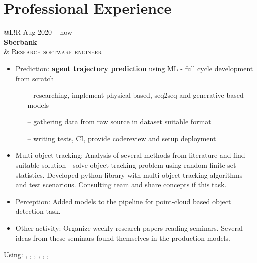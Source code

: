 \section*{Professional Experience}
\vspace{-0.5em}
\begin{tabular}{@{}L!{\VRule}R}
    Aug 2020 -- now                                                                                                                      \\ {\bf Sberbank} \\  &
    {\textsc{Research software engineer}}
    \begin{itemize}
        \item Prediction: \textbf{agent trajectory prediction} using ML - full cycle development from scratch
              \begin{itemize}
                  \item[--] researching, implement physical-based, seq2seq and generative-based models
                  \item[--] gathering data from raw source in dataset suitable format
                  \item[--] writing tests, CI, provide codereview and setup deployment
              \end{itemize}
        \item Multi-object tracking: Analysis of several methods from literature and find suitable solution - solve object tracking problem using random finite set statistics. Developed python library with multi-object tracking algorithms and test scenarious. Consulting team and share concepts if this task.
        \item Perception: Added models to the pipeline for point-cloud based object detection task.
        \item Other activity: Organize weekly research papers reading seminars. Several ideas from these seminars found themselves in the production models.
    \end{itemize}
    Using: , , , , , ,  \\
\end{tabular}
% 
